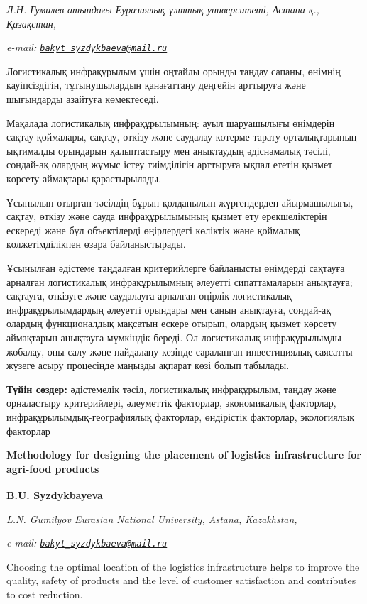 \emph{Л.Н. Гумилев атындағы Еуразиялық ұлттық университеті, Астана қ.,
Қазақстан,}

\emph{e-mail:
\href{mailto:bakyt_syzdykbaeva@mail.ru}{\nolinkurl{bakyt\_syzdykbaeva@mail.ru}}}

Логистикалық инфрақұрылым үшін оңтайлы орынды таңдау сапаны, өнімнің
қауіпсіздігін, тұтынушылардың қанағаттану деңгейін арттыруға және
шығындарды азайтуға көмектеседі.

Мақалада логистикалық инфрақұрылымның: ауыл шаруашылығы өнімдерін сақтау
қоймалары, сақтау, өткізу және саудалау көтерме-тарату орталықтарының
ықтималды орындарын қалыптастыру мен анықтаудың әдіснамалық тәсілі,
сондай-ақ олардың жұмыс істеу тиімділігін арттыруға ықпал ететін қызмет
көрсету аймақтары қарастырылады.

Ұсынылып отырған тәсілдің бұрын қолданылып жүргендерден айырмашылығы,
сақтау, өткізу және сауда инфрақұрылымының қызмет ету ерекшеліктерін
ескереді және бұл объектілерді өңірлердегі көліктік және қоймалық
қолжетімділікпен өзара байланыстырады.

Ұсынылған әдістеме таңдалған критерийлерге байланысты өнімдерді сақтауға
арналған логистикалық инфрақұрылымның әлеуетті сипаттамаларын анықтауға;
сақтауға, өткізуге және саудалауға арналған өңірлік логистикалық
инфрақұрылымдардың әлеуетті орындары мен санын анықтауға, сондай-ақ
олардың функционалдық мақсатын ескере отырып, олардың қызмет көрсету
аймақтарын анықтауға мүмкіндік береді. Ол логистикалық инфрақұрылымды
жобалау, оны салу және пайдалану кезінде сараланған инвестициялық
саясатты жүзеге асыру процесінде маңызды ақпарат көзі болып табылады.

{\bfseries Түйін сөздер:} әдістемелік тәсіл, логистикалық инфрақұрылым,
таңдау және орналастыру критерийлері, әлеуметтік факторлар, экономикалық
факторлар, инфрақұрылымдық-географиялық факторлар, өндірістік факторлар,
экологиялық факторлар

{\bfseries Methodology for designing the placement of logistics
infrastructure for agri-food products}

{\bfseries B.U. Syzdykbayeva\textsuperscript{\envelope }}

\emph{L.N. Gumilyov Eurasian National University, Astana, Kazakhstan,}

\emph{e-mail:
\href{mailto:bakyt_syzdykbaeva@mail.ru}{\nolinkurl{bakyt\_syzdykbaeva@mail.ru}}}

Choosing the optimal location of the logistics infrastructure helps to
improve the quality, safety of products and the level of customer
satisfaction and contributes to cost reduction.


